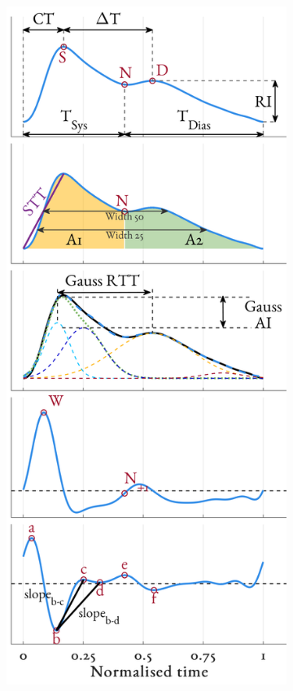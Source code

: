 \documentclass[fleqn,10pt]{wlscirep}
\begin{document}
\begin{figure}[ht]
\begin{subfigure}{.24\textwidth}
		\caption{}
	\end{subfigure}
	~
	\begin{subfigure}{.24\textwidth}
		\centering
		\includegraphics[height = \figHeight]{PPG_feats_washout.png}

\end{subfigure}
\end{figure}
\end{document}
